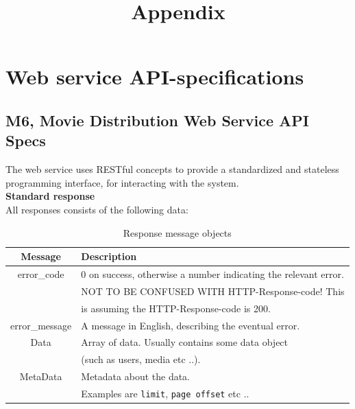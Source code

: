 \documentclass[11pt]{article}
\title{Appendix}
\begin{document}
\maketitle

\setcounter{tocdepth}{3}
\tableofcontents
\setcounter{page}{10}
\vspace*{1cm}

\newpage

\section{Web service API-specifications}
\subsection{M6, Movie Distribution Web Service API Specs}

The web service uses RESTful concepts to provide a standardized and stateless programming interface, for interacting with the system. \\

\textbf{Standard response} \\
All responses consists of the following data:

\begin{table}[H]
\caption{Response message objects}
\begin{center}
\begin{tabular}{|c|l|}
\hline
 Message                     &  Description                                               \\
\hline
 error\_code   &  0 on success, otherwise a number indicating the relevant error.  \\
                             &  NOT TO BE CONFUSED WITH HTTP-Response-code! This   \\
                             &  is assuming the HTTP-Response-code is 200.                \\
\hline
 error\_message  &  A message in English, describing the eventual error.      \\
\hline
Data & Array of data. Usually contains some data object \\
	& (such as users, media etc ..).
\\
\hline
MetaData & Metadata about the data. \\
	& Examples are \texttt{limit}, \texttt{page offset} etc .. \\
\hline
\end{tabular}
\end{center}
\end{table}
\end{document}
